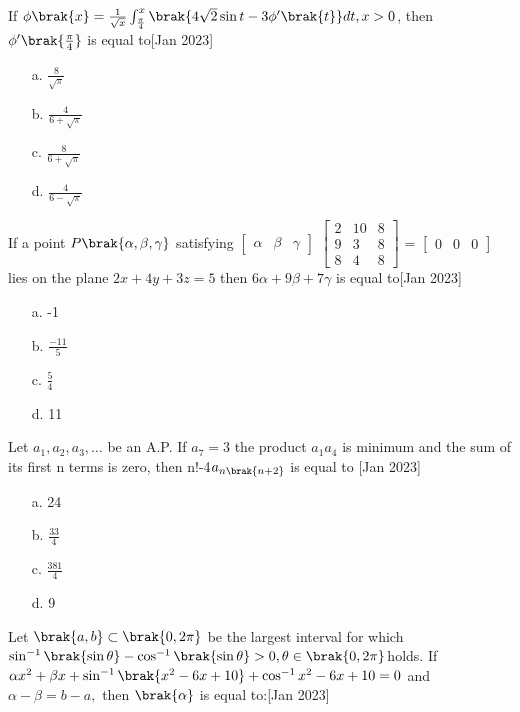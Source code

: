 \iffalse
\title{March:2021}
\author{AI24BTECH11007}
\section{mcq-single}
\fi
\item  If $\phi \brak{x} = \frac{1}{\sqrt{x}}\int _{\frac{\pi}{4}} ^x \brak{4\sqrt{2}\sin t - 3\phi '\brak{t}}dt, x>0$, then $\phi '\brak{\frac{\pi}{4}}$ is equal to\hfill  [Jan 2023]
\begin{enumerate}
    \item [a.] $\frac{8}{\sqrt{\pi}}$
    \item [b.]  $\frac{4}{6+\sqrt{\pi}}$
    \item [c.]  $\frac{8}{6+\sqrt{\pi}}$
    \item [d.]  $\frac{4}{6-\sqrt{\pi}}$
\end{enumerate}
\item If a point $P\brak{\alpha, \beta, \gamma}$ satisfying $\begin{bmatrix}\alpha & \beta & \gamma \end{bmatrix}$ $\begin{bmatrix}
    2 & 10 & 8\\ 9&3&8\\8&4&8
\end{bmatrix} $ = $\begin{bmatrix}
    0&0&0
\end{bmatrix}$ lies on the plane $2x+4y+3z=5$ then $6\alpha + 9\beta + 7\gamma$ is equal to\hfill  [Jan 2023]
\begin{enumerate}
    \item [a.] -1
    \item [b.] $\frac{-11}{5}$
    \item [c.] $\frac{5}{4}$
    \item [d.] 11
\end{enumerate}
\item Let $a_1, a_2, a_3, \ldots$ be an A.P. If $a_7=3$ the product $a_1a_4$ is minimum and the sum of its first n terms is zero, then n!-4$a_{n\brak{n+2}}$ is equal to  \hfill  [Jan 2023]
\begin{enumerate}
    \item [a.] 24
    \item [b.] $\frac{33}{4}$
    \item [c.] $\frac{381}{4}$
    \item [d.] 9
\end{enumerate}
\item Let $\brak{a, b} \subset \brak{ 0, 2\pi}$ be the largest interval for which$\sin ^{-1}\brak{\sin \theta} - \cos^{-1}\brak{\sin\theta} > 0,  \theta \in \brak{ 0, 2\pi}$holds. If$\alpha x^2 + \beta x+ \sin^{-1}\brak{x^2 - 6x + 10}+\cos ^{-1}{x^2 - 6x + 10} = 0$ and $\alpha - \beta = b - a,$ then $\brak{\alpha}$ is equal to:\hfill  [Jan 2023]


